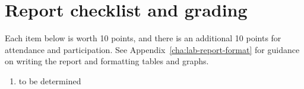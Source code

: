 \section{Report checklist and grading}

Each item below is worth 10 points, and there is an additional 10 points for attendance and participation. See Appendix\ \ref{cha:lab-report-format} for guidance on writing the report and formatting tables and graphs.

\begin{enumerate}
	\item to be determined
\end{enumerate}
